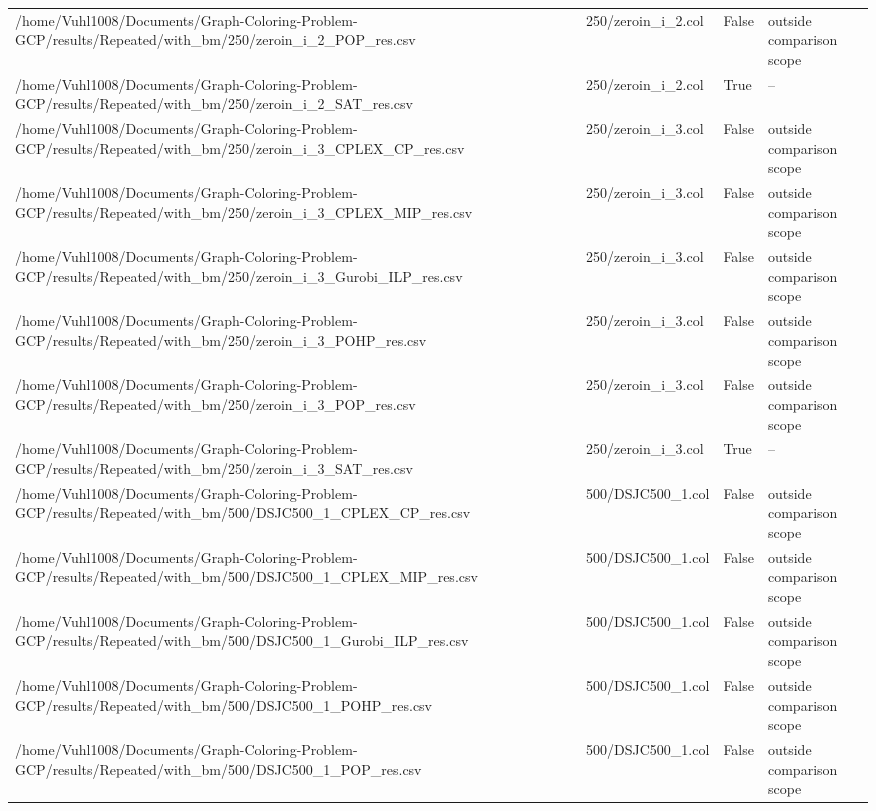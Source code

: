 \begin{table}[htbp]
\begin{tabular}{llll}
/home/Vuhl1008/Documents/Graph-Coloring-Problem-GCP/results/Repeated/with\_bm/250/zeroin\_i\_2\_POP\_res.csv & 250/zeroin\_i\_2.col & False & outside comparison scope \\
/home/Vuhl1008/Documents/Graph-Coloring-Problem-GCP/results/Repeated/with\_bm/250/zeroin\_i\_2\_SAT\_res.csv & 250/zeroin\_i\_2.col & True & -- \\
/home/Vuhl1008/Documents/Graph-Coloring-Problem-GCP/results/Repeated/with\_bm/250/zeroin\_i\_3\_CPLEX\_CP\_res.csv & 250/zeroin\_i\_3.col & False & outside comparison scope \\
/home/Vuhl1008/Documents/Graph-Coloring-Problem-GCP/results/Repeated/with\_bm/250/zeroin\_i\_3\_CPLEX\_MIP\_res.csv & 250/zeroin\_i\_3.col & False & outside comparison scope \\
/home/Vuhl1008/Documents/Graph-Coloring-Problem-GCP/results/Repeated/with\_bm/250/zeroin\_i\_3\_Gurobi\_ILP\_res.csv & 250/zeroin\_i\_3.col & False & outside comparison scope \\
/home/Vuhl1008/Documents/Graph-Coloring-Problem-GCP/results/Repeated/with\_bm/250/zeroin\_i\_3\_POHP\_res.csv & 250/zeroin\_i\_3.col & False & outside comparison scope \\
/home/Vuhl1008/Documents/Graph-Coloring-Problem-GCP/results/Repeated/with\_bm/250/zeroin\_i\_3\_POP\_res.csv & 250/zeroin\_i\_3.col & False & outside comparison scope \\
/home/Vuhl1008/Documents/Graph-Coloring-Problem-GCP/results/Repeated/with\_bm/250/zeroin\_i\_3\_SAT\_res.csv & 250/zeroin\_i\_3.col & True & -- \\
/home/Vuhl1008/Documents/Graph-Coloring-Problem-GCP/results/Repeated/with\_bm/500/DSJC500\_1\_CPLEX\_CP\_res.csv & 500/DSJC500\_1.col & False & outside comparison scope \\
/home/Vuhl1008/Documents/Graph-Coloring-Problem-GCP/results/Repeated/with\_bm/500/DSJC500\_1\_CPLEX\_MIP\_res.csv & 500/DSJC500\_1.col & False & outside comparison scope \\
/home/Vuhl1008/Documents/Graph-Coloring-Problem-GCP/results/Repeated/with\_bm/500/DSJC500\_1\_Gurobi\_ILP\_res.csv & 500/DSJC500\_1.col & False & outside comparison scope \\
/home/Vuhl1008/Documents/Graph-Coloring-Problem-GCP/results/Repeated/with\_bm/500/DSJC500\_1\_POHP\_res.csv & 500/DSJC500\_1.col & False & outside comparison scope \\
/home/Vuhl1008/Documents/Graph-Coloring-Problem-GCP/results/Repeated/with\_bm/500/DSJC500\_1\_POP\_res.csv & 500/DSJC500\_1.col & False & outside comparison scope \\

\end{tabular}
\end{table}
